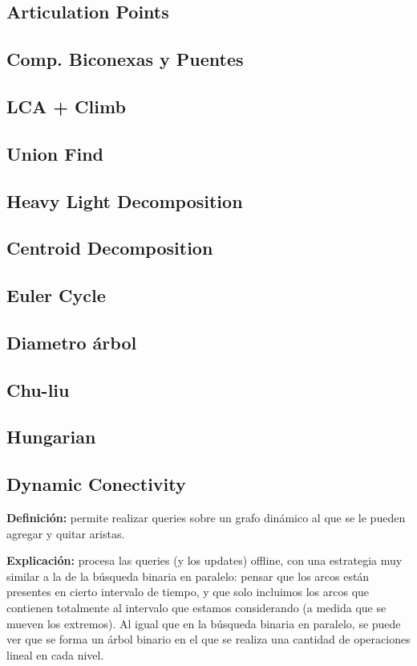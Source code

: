 {\subsection{Articulation Points}
\subsection{Comp. Biconexas y Puentes}
\subsection{LCA + Climb}
\subsection{Union Find} 
\subsection{Heavy Light Decomposition}
\subsection{Centroid Decomposition}
\subsection{Euler Cycle}
\subsection{Diametro árbol}
\subsection{Chu-liu}
\subsection{Hungarian}
\subsection{Dynamic Conectivity}
\textbf{Definición:} permite realizar queries sobre un grafo dinámico al que se le pueden agregar y quitar aristas.

\textbf{Explicación: } procesa las queries (y los updates) offline, con una estrategia muy similar a la de la búsqueda
binaria en paralelo: pensar que los arcos están presentes en cierto intervalo de tiempo, y que solo incluimos los arcos
que contienen totalmente al intervalo que estamos considerando (a medida que se mueven los extremos). Al igual
que en la búsqueda binaria en paralelo, se puede ver que se forma un árbol binario en el que se realiza una cantidad
de operaciones lineal en cada nivel.


}

